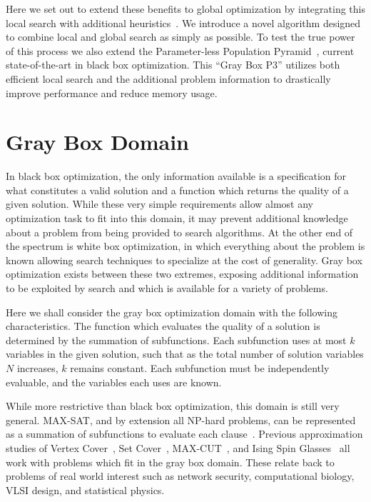 \documentclass{sig-alternate}
\begin{document}
Here we set out to extend these benefits to global optimization by integrating
this local search with additional heuristics~\cite{chen:2011:memetic}.
We introduce a novel algorithm designed to combine local
and global search as simply as possible. To test the true power of this
process we also extend the Parameter-less Population Pyramid~\cite{goldman:2014:p3},
current state-of-the-art in black box optimization. This ``Gray Box P3''
utilizes both efficient local search and the additional problem information
to drastically improve performance and reduce memory usage.

\section{Gray Box Domain}
\label{sec-gray-box}
In black box optimization, the only information available is a specification
for what constitutes a valid solution and a function which returns the quality
of a given solution. While these very simple requirements allow almost any
optimization task to fit into this domain, it may prevent additional knowledge
about a problem from being provided to search algorithms. At the other end of
the spectrum is white box optimization, in which everything about the problem
is known allowing search techniques to specialize at the cost of generality.
Gray box optimization exists between these two extremes, exposing additional
information to be exploited by search and which is available for a variety of problems.

Here we shall consider the gray box optimization domain with the following
characteristics. The function which evaluates the quality of a solution is determined by the summation
of subfunctions. Each subfunction uses at most $k$ variables in the given solution,
such that as the total number of solution variables $N$ increases, $k$ remains constant.
Each subfunction must be independently evaluable, and the variables each uses are known.

While more restrictive than black box optimization, this domain is still very general.
MAX-SAT, and by extension all NP-hard problems, can be represented
as a summation of subfunctions to evaluate each clause~\cite{whitley:2013:greedy}.
Previous approximation studies of Vertex Cover~\cite{oliveto:2009:vertexcover},
Set Cover~\cite{yu:2010:setcover}, MAX-CUT~\cite{festa:2002:maxcut}, and
Ising Spin Glasses~\cite{pelikan:2003:hboaising} all work with problems which fit
in the gray box domain. These relate back to problems of real world interest such
as network security, computational biology, VLSI design, and statistical physics.
\end{document}
